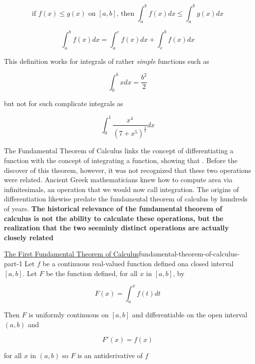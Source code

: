 \begin{equation}
    \text{if } f(x) \le g(x) \text{ on } [a, b] \text{,} \text{\ \ \ \ \ \ then \ \ \ \ \ \ }  \int_a^b f(x)dx \le \int_a^b g(x)dx
\end{equation}

\begin{equation}\label{eq:definite-integral-additive}
    \int_a^b f(x)dx = \int_a^c f(x)dx + \int_c^b f(x)dx
\end{equation}



This definition works for integrals of rather \textit{simple} functions such as

\[
    \int_0^b xdx = \frac{b^2}{2}
\]

but not for such complicate integrals as

\[
    \int_{0}^{1}\frac{x^4}{(7 + x^5)^{\frac{1}{3}}} dx
\]

The Fundamental Theorem of Calculus links the concept of differentiating a function with the concept of integrating a
function, showing that . Before
the discover of this theorem, however, it was not recognized that these two operations were related. Ancient Greek
mathematicians knew how to compute area via infinitesimals, an operation that we would now call integration. The origins
of differentiation likewise predate the fundamental theorem of calculus by hundreds of years. \textbf{The
historical relevance of the fundamental theorem of calculus is not the ability to calculate these operations, but the
realization that the two seeminly distinct operations are actually closely related}

\begin{Theorem}{\href{https://en.wikipedia.org/wiki/Fundamental\_theorem\_of\_calculus\#First\_part}{The First Fundamental Theorem of Calculus}}{fundamental-theorem-of-calculus-part-1}
    Let $f$ be a continuous real-valued function defined ona closed interval $[a, b]$. Let $F$ be the function defined,
    for all $x$ in $[a, b]$, by

    \begin{equation}
        F(x) = \int_a^x f(t) dt
    \end{equation}

    Then $F$ is uniformly continuous on $[a, b]$ and differentiable on the open interval $(a, b)$ and

    \begin{equation}
        F'(x) = f(x)
    \end{equation}

    for all $x$ in $(a, b)$ so $F$ is an antiderivative of $f$
\end{Theorem}

